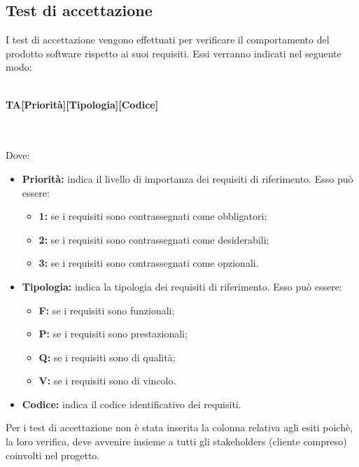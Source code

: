 \subsection{Test di accettazione}
I test di accettazione vengono effettuati per verificare il comportamento del prodotto software rispetto ai suoi requisiti. Essi verranno indicati nel seguente modo:\\\\
\centerline{\textbf{TA[Priorità][Tipologia][Codice]}}\\\\
Dove:
\begin{itemize}
	\item \textbf{Priorità:} indica il livello di importanza dei requisiti di riferimento. Esso può essere:
	\begin{itemize}
		\item \textbf{1:} se i requisiti sono contrassegnati come obbligatori;
		\item \textbf{2:} se i requisiti sono contrassegnati come desiderabili;
		\item \textbf{3:} se i requisiti sono contrassegnati come opzionali.
	\end{itemize}
	\item \textbf{Tipologia:} indica la tipologia dei requisiti di riferimento. Esso può essere:
	\begin{itemize}
		\item \textbf{F:} se i requisiti sono funzionali;
		\item \textbf{P:} se i requisiti sono prestazionali;
		\item \textbf{Q:} se i requisiti sono di qualità;
		\item \textbf{V:} se i requisiti sono di vincolo.
	\end{itemize}
	\item \textbf{Codice:} indica il codice identificativo dei requisiti.
\end{itemize}

\noindent Per i test di accettazione non è stata inserita la colonna relativa agli esiti poichè, la loro verifica, deve avvenire insieme a tutti gli stakeholders (cliente compreso) coinvolti nel progetto.

